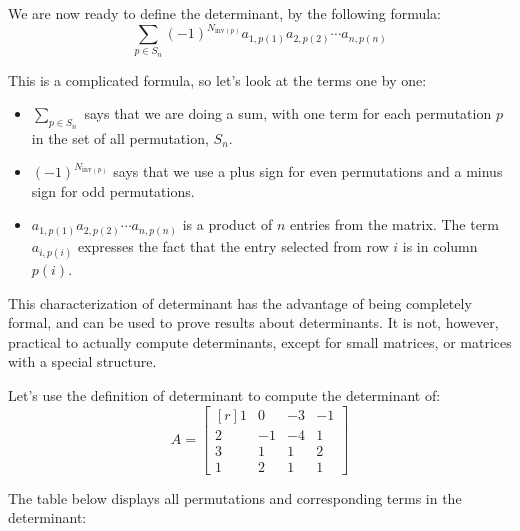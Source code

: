 \documentclass[12pt]{article}
\begin{document}
We are now ready to define the determinant, by the following formula:
\[
\sum_{p\in S_n}(-1)^{N_{\text{inv}(p)}}a_{1,p(1)}a_{2,p(2)}\cdots a_{n,p(n)}
\]

This is a complicated formula, so let's look at the terms one by one:

\begin{itemize}
\item $\displaystyle \sum_{p\in S_n}$ says that we are doing a sum, with one term for each permutation $p$ in the set of all permutation, $S_n$.

\item $(-1)^{N_{\text{inv}(p)}}$ says that we use a plus sign for even permutations and a minus sign for odd permutations.

\item $a_{1,p(1)}a_{2,p(2)}\cdots a_{n,p(n)}$ is a product of $n$ entries from the matrix. The term $a_{i,p(i)}$ expresses the fact that the entry selected from row $i$ is in column $p(i)$.
\end{itemize}

This characterization of determinant has the advantage of being completely formal, and can be used to prove results about determinants. It is not, however, practical to actually compute determinants, except for small matrices, or matrices with a special structure.

Let's use the definition of determinant to compute the determinant of:
\[
A = \left[\begin{matrix*}[r]1 & 0 & -3 & -1\\2 & -1 & -4 & 1\\3 & 1 & 1 & 2\\1 & 2 & 1 & 1\end{matrix*}\right]
\]

The table below displays all permutations and corresponding terms in the determinant:
\end{document}
